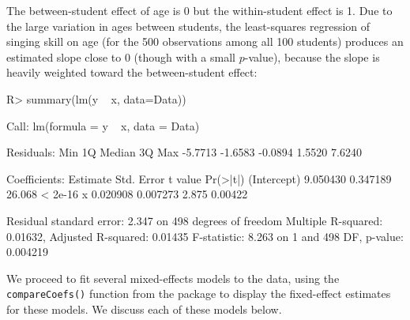 \documentclass[
]{jss}
\begin{document}
\begin{CodeChunk}
\begin{figure}
s, and (b)--(e) predictions from several mixed models fit to the data}\label{fig:plot1}
\end{figure}
\end{CodeChunk}

The between-student effect of age is 0 but the within-student effect is
1. Due to the large variation in ages between students, the
least-squares regression of singing skill on age (for the 500
observations among all 100 students) produces an estimated slope close
to 0 (though with a small \(p\)-value), because the slope is heavily
weighted toward the between-student effect:

\begin{CodeChunk}
\begin{CodeInput}
R> summary(lm(y ~ x, data=Data))
\end{CodeInput}
\begin{CodeOutput}

Call:
lm(formula = y ~ x, data = Data)

Residuals:
    Min      1Q  Median      3Q     Max 
-5.7713 -1.6583 -0.0894  1.5520  7.6240 

Coefficients:
            Estimate Std. Error t value Pr(>|t|)
(Intercept) 9.050430   0.347189  26.068  < 2e-16
x           0.020908   0.007273   2.875  0.00422

Residual standard error: 2.347 on 498 degrees of freedom
Multiple R-squared:  0.01632,   Adjusted R-squared:  0.01435 
F-statistic: 8.263 on 1 and 498 DF,  p-value: 0.004219
\end{CodeOutput}
\end{CodeChunk}

We proceed to fit several mixed-effects models to the data, using the
\texttt{compareCoefs()} function from the  package
\citep{FoxWeisberg:2019} to display the fixed-effect estimates for these
models. We discuss each of these models below.
\end{document}
